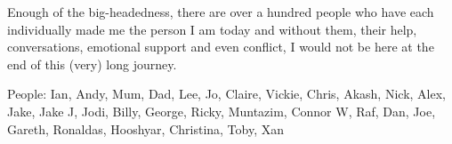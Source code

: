 Enough of the big-headedness, there are over a hundred people who have each individually made me the person I am today and without them, their help, conversations, emotional support and even conflict, I would not be here at the end of this (very) long journey.

People: Ian, Andy, Mum, Dad, Lee, Jo, Claire, Vickie, Chris, Akash, Nick, Alex, Jake, Jake J, Jodi, Billy, George, Ricky, Muntazim, Connor W, Raf, Dan, Joe, Gareth, Ronaldas, Hooshyar, Christina, Toby, Xan
